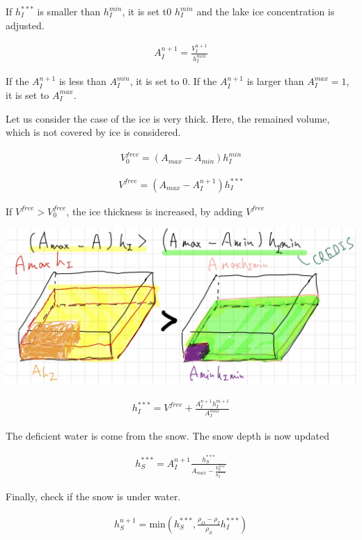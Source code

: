 If \(h_I^{***}\) is smaller than \(h_I^{min}\), it is set t0
\(h_I^{min}\) and the lake ice concentration is adjusted.

\begin{eqnarray}
    A_I^{n+1} = \frac{V_I^{n+1}}{h_I^{min}}
\end{eqnarray}

If the \(A_I^{n+1}\) is less than \(A_I^{min}\), it is set to 0. If the
\(A_I^{n+1}\) is larger than \(A_I^{max}=1\), it is set to
\(A_I^{max}\).

Let us consider the case of the ice is very thick. Here, the remained
volume, which is not covered by ice is considered.

\begin{eqnarray}
    V_0^{free} = (A_{max}-A_{min})h_I^{min}
\end{eqnarray}

\begin{eqnarray}
    V^{free} = (A_{max}-A_I^{n+1})h_I^{*** }
\end{eqnarray}

If \(V^{free}>V_0^{free}\), the ice thickness is increased, by adding
\(V^{free}\)

\includegraphics{lakeice_volume.jpeg}

\begin{eqnarray}
    h_I^{*** } = V^{free} + \frac{A_I^{n+1} h_I^{m+1}}{A_I^{max}}
\end{eqnarray}

The deficient water is come from the snow. The snow depth is now updated

\begin{eqnarray}
    h_S^{*** } = A_I^{n+1}\frac{h_S^{***}}{A_{max}-\frac{V_0^{free}}{h_I^{*** }}}
\end{eqnarray}

Finally, check if the snow is under water.

\begin{eqnarray}
    h_S^{n+1} = \mathrm{min}(h_S^{*** }, \frac{\rho_O-\rho_I}{\rho_S}h_I^{*** })
\end{eqnarray}

